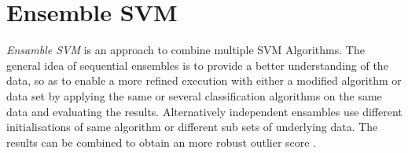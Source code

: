 \section{Ensemble SVM}\label{Chapter:Ensemble}
\textit{Ensamble SVM} is an approach to combine multiple SVM Algorithms. The general idea of sequential ensembles is to provide a better understanding of the data, so as to enable a more refined execution with either a modified algorithm or data set \cite{Aggarwal:2013} by applying the same or several classification algorithms on the same data and evaluating the results. Alternatively independent ensambles use different initialisations of same algorithm or different sub sets of underlying data. The results can be combined to obtain an more robust outlier score \cite{Aggarwal:2013}.






